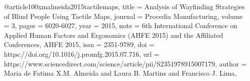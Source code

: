 @article{100xmalmeida2015tactilemaps,
title = {Analysis of Wayfinding Strategies of Blind People Using Tactile Maps},
journal = {Procedia Manufacturing},
volume = {3},
pages = {6020-6027},
year = {2015},
note = {6th International Conference on Applied Human Factors and Ergonomics (AHFE 2015) and the Affiliated Conferences, AHFE 2015},
issn = {2351-9789},
doi = {https://doi.org/10.1016/j.promfg.2015.07.716},
url = {https://www.sciencedirect.com/science/article/pii/S2351978915007179},
author = {Maria de Fatima X.M. Almeida and Laura B. Martins and Francisco J. Lima},
}